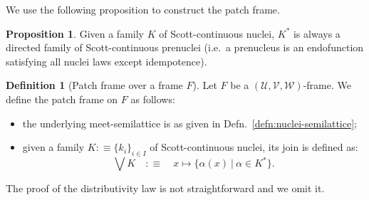 \documentclass[a4paper, 10pt]{article}
\theoremstyle{definition}
\newtheorem{prop}{Proposition}
\newtheorem{defn}{Definition}
\newcommand{\UU}{\mathcal{U}}
\newcommand{\VV}{\mathcal{V}}
\newcommand{\WW}{\mathcal{W}}
\begin{document}
We use the following proposition to construct the patch frame.

\begin{prop}
  Given a family $K$ of Scott-continuous nuclei, $K^*$ is always a directed
  family of Scott-continuous prenuclei (i.e.\ a prenucleus is an endofunction
  satisfying all nuclei laws except idempotence).
\end{prop}

\begin{defn}[Patch frame over a frame $F$]
  Let $F$ be a $(\UU, \VV, \WW)$-frame. We define the patch frame on $F$ as
  follows:
  \begin{itemize}
    \item the underlying meet-semilattice is as given in
      Defn.~\ref{defn:nuclei-semilattice};
    \item given a family $K :\equiv \{ k_i \}_{i \in I}$ of Scott-continuous nuclei,
      its join is defined as:
      \begin{equation*}
        \bigvee K \quad:\equiv\quad x \mapsto \{ \alpha(x) ~|~ \alpha \in K^* \}.
      \end{equation*}
  \end{itemize}
  The proof of the distributivity law is not straightforward and we omit it.
\end{defn}

\printbibliography
\end{document}
